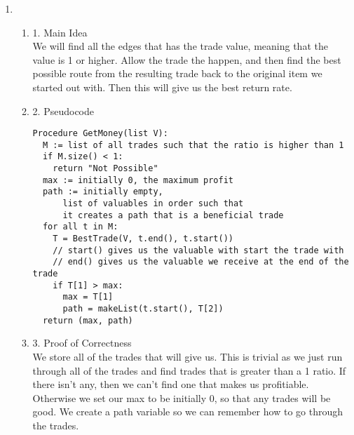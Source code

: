 \documentclass[11pt]{article}
\newenvironment{qparts}{\begin{enumerate}[{(}a{)}]}{\end{enumerate}}
\begin{document}
\begin{qparts}
\begin{qparts}
\textbf{Induction step:} For $N = K + 1$. We know that our dictionary has already stored all the best possible paths such that we get the best ratio trade values, starting from $V_1$ to $V_2$. So when we add in the additional valuable, we add into another case that the initial value has to compare. In this case, everything it comes to below it is already written within the dictionary. If we stick the new values randomly in anywhere, it will always the path below and we can pull from dictionary, then update all the values above it if it satisfies the conditions.
\item[4.] Running Time Analysis \\
$O(n^2)$ \\

Essentially we are trying to find all the possible paths we can take, hence we make a fully connected graph. Given $N$ nodes, we can make approximately $N^2$ edges. As a result, we're going to traverse that amount of edges. Hence it gives a $O(n^2)$ algorithm.
\end{qparts}
\item \begin{qparts}
\item [1.] Main Idea \\
We will find all the edges that has the trade value, meaning that the value is 1 or higher. Allow the trade the happen, and then find the best possible route from the resulting trade back to the original item we started out with. Then this will give us the best return rate.
\item[2.] Pseudocode 
\begin{verbatim}
Procedure GetMoney(list V):
  M := list of all trades such that the ratio is higher than 1
  if M.size() < 1:
    return "Not Possible"
  max := initially 0, the maximum profit
  path := initially empty, 
      list of valuables in order such that
      it creates a path that is a beneficial trade
  for all t in M:
    T = BestTrade(V, t.end(), t.start())
    // start() gives us the valuable with start the trade with
    // end() gives us the valuable we receive at the end of the trade
    if T[1] > max:
      max = T[1]
      path = makeList(t.start(), T[2])
  return (max, path)
\end{verbatim}
\item[3.] Proof of Correctness \\
We store all of the trades that will give us. This is trivial as we just run through all of the trades and find trades that is greater than a 1 ratio. If there isn't any, then we can't find one that makes us profitiable. Otherwise we set our max to be initially 0, so that any trades will be good. We create a path variable so we can remember how to go through the trades. \\


\end{qparts}
\end{qparts}
\end{document}
